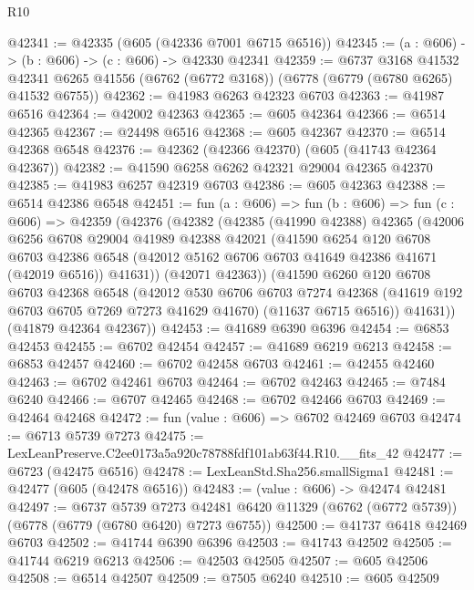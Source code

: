 \begin{lexlean}{R10}
\begin{coremodule}
@42341 := @42335 (@605 (@42336 @7001 @6715 @6516))
@42345 := (a : @606) -> (b : @606) -> (c : @606) -> @42330 @42341
@42359 := @6737
    @3168
    @41532
    @42341
    @6265
    @41556
    (@6762 (@6772 @3168))
    (@6778 (@6779 (@6780 @6265) @41532 @6755))
@42362 := @41983 @6263 @42323 @6703
@42363 := @41987 @6516
@42364 := @42002 @42363
@42365 := @605 @42364
@42366 := @6514 @42365
@42367 := @24498 @6516
@42368 := @605 @42367
@42370 := @6514 @42368 @6548
@42376 := @42362 (@42366 @42370) (@605 (@41743 @42364 @42367))
@42382 := @41590 @6258 @6262 @42321 @29004 @42365 @42370
@42385 := @41983 @6257 @42319 @6703
@42386 := @605 @42363
@42388 := @6514 @42386 @6548
@42451 := fun (a : @606) =>
  fun (b : @606) =>
  fun (c : @606) =>
  @42359
    (@42376
      (@42382
        (@42385
          (@41990 @42388)
          @42365
          (@42006
            @6256
            @6708
            @29004
            @41989
            @42388
            @42021
            (@41590
              @6254
              @120
              @6708
              @6703
              @42386
              @6548
              (@42012 @5162 @6706 @6703 @41649 @42386 @41671 (@42019 @6516))
              @41631))
          (@42071 @42363))
        (@41590
          @6260
          @120
          @6708
          @6703
          @42368
          @6548
          (@42012
            @530
            @6706
            @6703
            @7274
            @42368
            (@41619 @192 @6703 @6705 @7269 @7273 @41629 @41670)
            (@11637 @6715 @6516))
          @41631))
      (@41879 @42364 @42367))
@42453 := @41689 @6390 @6396
@42454 := @6853 @42453
@42455 := @6702 @42454
@42457 := @41689 @6219 @6213
@42458 := @6853 @42457
@42460 := @6702 @42458 @6703
@42461 := @42455 @42460
@42463 := @6702 @42461 @6703
@42464 := @6702 @42463
@42465 := @7484 @6240
@42466 := @6707 @42465
@42468 := @6702 @42466 @6703
@42469 := @42464 @42468
@42472 := fun (value : @606) => @6702 @42469 @6703
@42474 := @6713 @5739 @7273
@42475 := LexLeanPreserve.C2ee0173a5a920c78788fdf101ab63f44.R10.__fits_42
@42477 := @6723 (@42475 @6516)
@42478 := LexLeanStd.Sha256.smallSigma1
@42481 := @42477 (@605 (@42478 @6516))
@42483 := (value : @606) -> @42474 @42481
@42497 := @6737
    @5739
    @7273
    @42481
    @6420
    @11329
    (@6762 (@6772 @5739))
    (@6778 (@6779 (@6780 @6420) @7273 @6755))
@42500 := @41737 @6418 @42469 @6703
@42502 := @41744 @6390 @6396
@42503 := @41743 @42502
@42505 := @41744 @6219 @6213
@42506 := @42503 @42505
@42507 := @605 @42506
@42508 := @6514 @42507
@42509 := @7505 @6240
@42510 := @605 @42509

\end{coremodule}
\end{lexlean}
